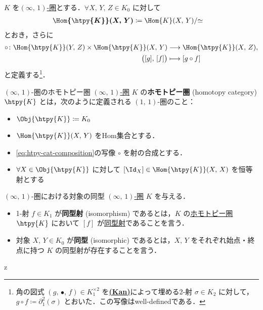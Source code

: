 \documentclass[TQFT_main]{subfiles}
\begin{document}
$K$ を\hyperref[def:infinity-1]{$(\infty,\, 1)$-圏}とする．$\forall X,\, Y,\, Z \in K_0$ に対して
\begin{align}
    \bm{\Hom{\htpy{K}} (X,\, Y)} &\coloneqq \Hom{K} (X,\, Y)/{\simeq}
\end{align}
とおき，さらに
\begin{align}
    \label{eq:htpy-cat-composition}
    \circ \colon \Hom{\htpy{K}}(Y,\, Z) \times \Hom{\htpy{K}}(X,\, Y) &\lto \Hom{\htpy{K}} (X,\, Z), \\
    \bigl([g],\, [f]\bigr) &\lmto [g \circ f]
\end{align}
と定義する\footnote{角の図式 $(g,\, \bullet,\, f) \in K_1^{\times 2}$ を\hyperref[def:KanCplx]{\textsf{\textbf{(Kan)}}}によって埋める2-射 $\sigma \in K_2$ に対して，$g \circ f \coloneqq \partial^2_1 (\sigma)$ とおいた．この写像はwell-definedである．}．
    

\begin{mydef}[label=def:hcat-infty,breakable]{{$(\infty,\, 1)$}-圏のホモトピー圏}
    \hyperref[def:infinity-1]{$(\infty,\, 1)$-圏} $K$ の\textbf{ホモトピー圏} (homotopy category) $\htpy{K}$ とは，次のように定義される $(1,\, 1)$-圏のこと：
    \begin{itemize}
        \item $\Obj{\htpy{K}} \coloneqq K_0$
        \item $\Hom{\htpy{K}} (X,\, Y)$ をHom集合とする．
        \item \eqref{eq:htpy-cat-composition}の写像 $\circ$ を射の合成とする．
        \item $\forall X \in \Obj{\htpy{K}}$ に対して $[\Id_X] \in \Hom{\htpy{K}}(X,\, X)$ を恒等射とする
    \end{itemize}
\end{mydef}

\begin{mydef}[label=def:isom-infty]{{$(\infty,\, 1)$}-圏における対象の同型}
    \hyperref[def:infinity-1]{$(\infty,\, 1)$-圏} $K$ を与える．
    \begin{itemize}
        \item 1-射 $f \in K_1$ が\textbf{同型射} (isomorphism) であるとは，$K$ の\hyperref[def:hcat-infty]{ホモトピー圏} $\htpy{K}$ において $[f]$ が\hyperref[def:iso]{同型射}であることを言う．
        \item 対象 $X,\, Y \in K_0$ が\textbf{同型} (isomorphic) であるとは，$X,\, Y$ をそれぞれ始点・終点に持つ $K$ の同型射が存在することを言う．
    \end{itemize}z
\end{mydef}
\end{document}
